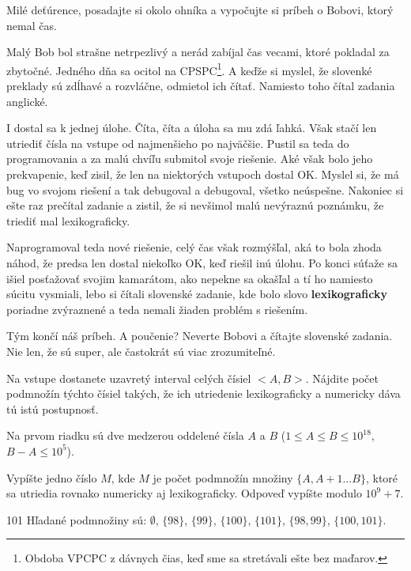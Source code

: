 





Milé deťúrence, posadajte si okolo ohníka a vypočujte si príbeh o Bobovi, ktorý nemal čas.

Malý Bob bol strašne netrpezlivý a nerád zabíjal čas vecami, ktoré pokladal za zbytočné. Jedného dňa
sa ocitol na CPSPC\footnote{Obdoba VPCPC z dávnych čias, keď sme sa stretávali ešte bez maďarov.}. A
keďže si myslel, že slovenké preklady sú zdĺhavé a rozvláčne, odmietol ich čítať. Namiesto toho
čítal zadania anglické.

I dostal sa k jednej úlohe. Číta, číta a úloha sa mu zdá ľahká. Však stačí len utriediť čísla na
vstupe od najmenšieho po najväčšie. Pustil sa teda do programovania a za malú chvíľu submitol svoje
riešenie. Aké však bolo jeho prekvapenie, keď zisil, že len na niektorých vstupoch dostal OK.
Myslel si, že má bug vo svojom riešení a tak debugoval a debugoval, všetko neúspešne. Nakoniec si
ešte raz prečítal zadanie a zistil, že si nevšimol malú nevýraznú poznámku, že triediť mal
lexikograficky.

Naprogramoval teda nové riešenie, celý čas však rozmýšľal, aká to bola zhoda náhod, že predsa len
dostal niekoľko OK, keď riešil inú úlohu. Po konci súťaže sa išiel posťažovať svojim kamarátom, ako
nepekne sa okašľal a tí ho namiesto súcitu vysmiali, lebo si čítali slovenské zadanie, kde bolo
slovo \textbf{lexikograficky} poriadne zvýraznené a teda nemali žiaden problém s riešením.

Tým končí náš príbeh. A poučenie? Neverte Bobovi a čítajte slovenské zadania. Nie len, že sú super,
ale častokrát sú viac zrozumiteľné.


Na vstupe dostanete uzavretý interval celých čísiel $<A,B>$. Nájdite počet podmnožín týchto čísiel
takých, že ich utriedenie lexikograficky a numericky dáva tú istú postupnosť.


Na prvom riadku sú dve medzerou oddelené čísla $A$ a $B$ ($1 \leq A \leq B \leq 10^{18}$, $B-A \leq
10^5$).


Vypíšte jedno číslo $M$, kde $M$ je počet podmnožín množiny $\{A, A+1 \dots B\}$, ktoré sa utriedia
rovnako numericky aj lexikograficky. Odpoveď vypíšte modulo $10^9 + 7$.



 101
\sampleCOMMENT
Hľadané podmnožiny sú: $\emptyset$, $\{98\}$, $\{99\}$, $\{100\}$, $\{101\}$, $\{98, 99\}$, $\{100, 101\}$.
\sampleEND




